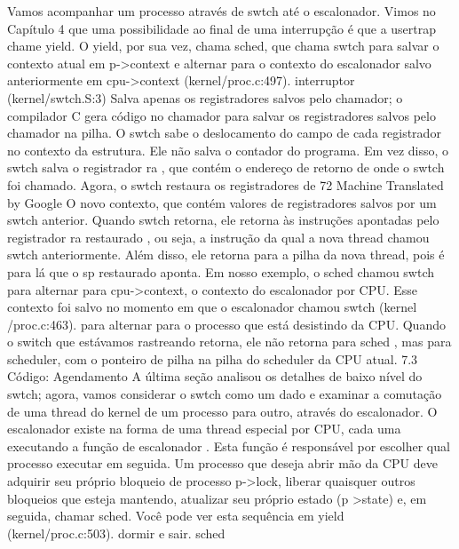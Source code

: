  Vamos  acompanhar  um  processo  através  de  swtch  até  o  escalonador.  Vimos  no  Capítulo  4  que  uma  
possibilidade  ao  final  de  uma  interrupção  é  que  a  usertrap  chame  yield.  O  yield,  por  sua  vez,  chama  sched,  
que  chama  swtch  para  salvar  o  contexto  atual  em  p->context  e  alternar  para  o  contexto  do  escalonador  salvo  
anteriormente  em  cpu->context  (kernel/proc.c:497).
 interruptor  (kernel/swtch.S:3)  Salva  apenas  os  registradores  salvos  pelo  chamador;  o  compilador  C  gera  código  no  
chamador  para  salvar  os  registradores  salvos  pelo  chamador  na  pilha.  O  swtch  sabe  o  deslocamento  do  campo  de  cada  
registrador  no  contexto  da  estrutura.  Ele  não  salva  o  contador  do  programa.  Em  vez  disso,  o  swtch  salva  o  registrador  ra ,  
que  contém  o  endereço  de  retorno  de  onde  o  swtch  foi  chamado.  Agora,  o  swtch  restaura  os  registradores  de
 72
Machine Translated by Google
 O  novo  contexto,  que  contém  valores  de  registradores  salvos  por  um  swtch  anterior.  Quando  swtch  retorna,  ele  retorna  
às  instruções  apontadas  pelo  registrador  ra  restaurado ,  ou  seja,  a  instrução  da  qual  a  nova  thread  chamou  swtch  
anteriormente.  Além  disso,  ele  retorna  para  a  pilha  da  nova  thread,  pois  é  para  lá  que  o  sp  restaurado  aponta.
 Em  nosso  exemplo,  o  sched  chamou  swtch  para  alternar  para  cpu->context,  o  contexto  do  escalonador  por  CPU.  
Esse  contexto  foi  salvo  no  momento  em  que  o  escalonador  chamou  swtch  (kernel /proc.c:463).  para  alternar  para  o  
processo  que  está  desistindo  da  CPU.  Quando  o  switch  que  estávamos  rastreando  retorna,  ele  não  retorna  para  sched ,  
mas  para  scheduler,  com  o  ponteiro  de  pilha  na  pilha  do  scheduler  da  CPU  atual.
 7.3  Código:  Agendamento
 A  última  seção  analisou  os  detalhes  de  baixo  nível  do  swtch;  agora,  vamos  considerar  o  swtch  como  um  dado  e  examinar  
a  comutação  de  uma  thread  do  kernel  de  um  processo  para  outro,  através  do  escalonador.  O  escalonador  existe  na  
forma  de  uma  thread  especial  por  CPU,  cada  uma  executando  a  função  de  escalonador .  Esta  função  é  responsável  
por  escolher  qual  processo  executar  em  seguida.  Um  processo  que  deseja  abrir  mão  da  CPU  deve  adquirir  seu  próprio  
bloqueio  de  processo  p->lock,  liberar  quaisquer  outros  bloqueios  que  esteja  mantendo,  atualizar  seu  próprio  estado  (p
>state)  e,  em  seguida,  chamar  sched.  Você  pode  ver  esta  sequência  em  yield  (kernel/proc.c:503).  dormir  e  sair.  sched  
